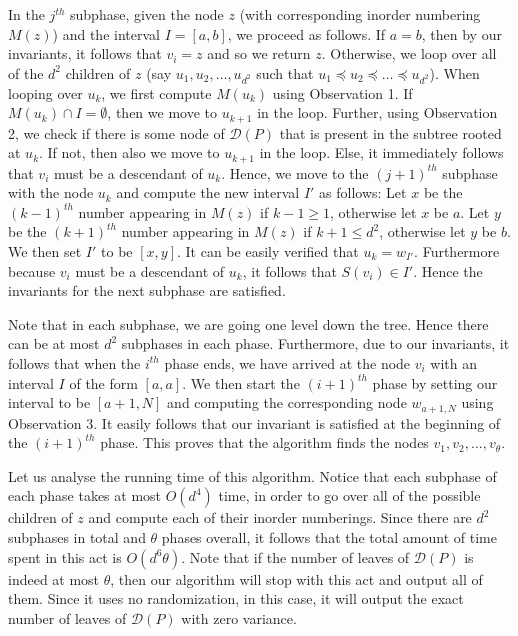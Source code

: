 In the $j^{th}$ subphase, given the node $z$ (with corresponding inorder numbering $M(z)$) and the interval $I = [a,b]$, we proceed as follows. If $a = b$, then by our invariants, it follows that $v_i = z$ and so we return $z$. Otherwise, we loop over all of the $d^2$ children of $z$ (say $u_1,u_2,\dots,u_{d^2}$ such that $u_1 \preceq u_2 \preceq \dots \preceq u_{d^2}$). 
When looping over $u_k$, we first compute $M(u_k)$ using Observation 1. If $M(u_k) \cap I = \emptyset$, then we move to $u_{k+1}$ in the loop. Further, using Observation 2, we check if there is some node of $\mathcal{D}(P)$ that is present in the subtree rooted at $u_k$. If not, then also we move to $u_{k+1}$ in the loop. 
Else, it immediately follows that $v_i$ must be a descendant of $u_k$. 
Hence, we move to the $(j+1)^{th}$ subphase with the node $u_k$ and compute the new interval $I'$ as follows: Let $x$ be the $(k-1)^{th}$ number appearing in $M(z)$ if $k - 1 \ge 1$, otherwise let $x$ be $a$. Let $y$ be the $(k+1)^{th}$ number appearing in $M(z)$ if $k+1 \le d^2$, otherwise let $y$ be $b$. We then set $I'$ to be $[x,y]$. It can be easily verified that $u_k = w_{I'}$. Furthermore because $v_i$ must be a descendant of $u_k$, it follows that $S(v_i) \in I'$. Hence the invariants for the next subphase are satisfied.

Note that in each subphase, we are going one level down the tree. Hence there can be at most $d^2$ subphases in each phase. Furthermore, due to our invariants, it follows
that when the $i^{th}$ phase ends, we have arrived at the node $v_i$ with an interval $I$ of the form $[a,a]$. We then start the $(i+1)^{th}$ phase by setting our interval to be $[a+1,N]$ and computing the corresponding node $w_{a+1,N}$ using Observation 3. 
It easily follows that our invariant is satisfied at the beginning of the $(i+1)^{th}$ phase. This proves that the algorithm finds the nodes $v_1,v_2,\dots,v_{\theta}$.

Let us analyse the running time of this algorithm. Notice that each subphase of each phase
takes at most $O(d^4)$ time, in order to go over all of the possible children of $z$ and compute each of their inorder numberings. Since there are $d^2$ subphases in total and $\theta$ phases overall, it follows that the total amount of time spent in this act is $O(d^6 \theta)$. Note that if the number of leaves of $\mathcal{D}(P)$ is indeed
at most $\theta$, then our algorithm will stop with this act and output all of them.
Since it uses no randomization, in this case, it will output the exact number of leaves
of $\mathcal{D}(P)$ with zero variance.

